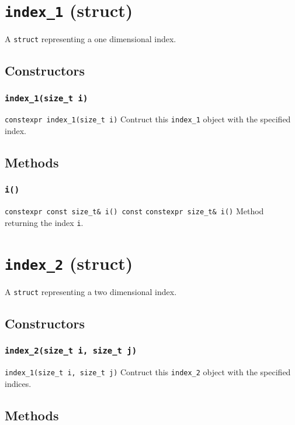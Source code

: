 \section{\texttt{index\_1} (struct)}
A \texttt{struct} representing a one dimensional index.

\subsection{Constructors}
\subsubsection{\texttt{index\_1(size\_t i)}}
\texttt{constexpr index\_1(size\_t i)}\newline
Contruct this \texttt{index\_1} object with the specified index.

\subsection{Methods}
\subsubsection{\texttt{i()}}
\texttt{constexpr const size\_t\& i() const}\newline
\texttt{constexpr size\_t\& i()}\newline
Method returning the index \texttt{i}.

\section{\texttt{index\_2} (struct)}
A \texttt{struct} representing a two dimensional index.

\subsection{Constructors}
\subsubsection{\texttt{index\_2(size\_t i, size\_t j)}}
\texttt{index\_1(size\_t i, size\_t j)}\newline
Contruct this \texttt{index\_2} object with the specified indices.

\subsection{Methods}

